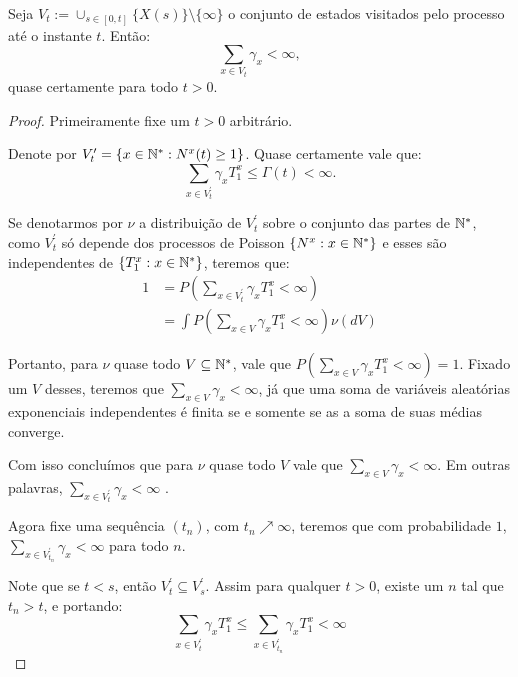 \begin{proposicao}
  \label{prop:gamma-somavel}
  Seja $V_t := \cup_{s \in [0, t]} \{ X(s) \} \setminus \{\infty\}$ o
  conjunto de estados visitados pelo processo até o instante
  $t$. Então:
  \begin{displaymath}
    \sum_{x \in V_t} \gamma_x < \infty,
  \end{displaymath}
  quase certamente para todo $t > 0$.
\end{proposicao}
\begin{proof}

  Primeiramente fixe um $t > 0$ arbitrário.

  Denote por $V^\prime_t = \{ x \in {\mathbb{N^*}}: N^x(t) \geq 1 \}$. Quase
  certamente vale que:
  \begin{displaymath}
    \sum_{x \in V^\prime_t} \gamma_x T^x_1 \leq \Gamma(t) < \infty.
  \end{displaymath}

  Se denotarmos por $\nu$ a distribuição de $V^\prime_t$ sobre o conjunto
  das partes de ${\mathbb{N^*}}$, como $V^\prime_t$ só depende dos processos de
  Poisson $\{N^x: x \in {\mathbb{N^*}}\}$ e esses são independentes de $\{ T^x_1:
  x \in {\mathbb{N^*}} \}$, teremos que:
  \begin{align*}
    1 &= P\left(\sum_{x \in V^\prime_t} \gamma_x T^x_1 < \infty
    \right)\\
    &=\int P\left(\sum_{x \in V} \gamma_x T^x_1 < \infty
    \right) \nu(dV)
  \end{align*}

  Portanto, para $\nu$ quase todo $V \subseteq {\mathbb{N^*}}$, vale que
  $P(\sum_{x \in V} \gamma_x T^x_1 < \infty) = 1$. Fixado um
  $V$ desses, teremos que $\sum_{x \in V}\gamma_x < \infty$, já que
  uma soma de variáveis aleatórias exponenciais independentes é finita
  \qc se e somente se as a soma de suas médias converge.

  Com isso concluímos que para $\nu$ quase todo $V$ vale que $\sum_{x
    \in V}\gamma_x < \infty$. Em outras palavras, $\sum_{x \in
    V^\prime_t}\gamma_x < \infty$ \qc.

  Agora fixe uma sequência $(t_n)$, com $t_n\nearrow \infty$, teremos
  que com probabilidade $1$, $\sum_{x \in V^\prime_{t_n}}\gamma_x <
  \infty$ para todo $n$.

  Note que se $t < s$, então $V^\prime_t \subseteq V^\prime_s$. Assim
  para qualquer $t > 0$, existe um $n$ tal que $t_n > t$, e portando:
  \begin{displaymath}
    \sum_{x \in V^\prime_t}\gamma_x T^x_1 \leq
    \sum_{x \in V^\prime_{t_n}}\gamma_x T^x_1 < \infty
  \end{displaymath}


\end{proof}
